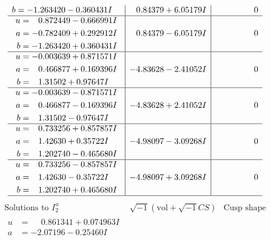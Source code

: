 \documentclass[1p]{elsarticle_modified}
\theoremstyle{definition}
\newcommand{\I}{\sqrt{-1}}
\begin{document}
$$\begin{array}{c|c|c}
\begin{aligned}
b &= -1.263420 - 0.360431 I\end{aligned}
 & \phantom{-}0.84379 + 6.05179 I & \phantom{-0.000000 } 0 \\ \hline\begin{aligned}
u &= \phantom{-}0.872449 - 0.666991 I \\
a &= -0.782409 + 0.292912 I \\
b &= -1.263420 + 0.360431 I\end{aligned}
 & \phantom{-}0.84379 - 6.05179 I & \phantom{-0.000000 } 0 \\ \hline\begin{aligned}
u &= -0.003639 + 0.871571 I \\
a &= \phantom{-}0.466877 + 0.169396 I \\
b &= \phantom{-}1.31502 + 0.97647 I\end{aligned}
 & -4.83628 - 2.41052 I & \phantom{-0.000000 } 0 \\ \hline\begin{aligned}
u &= -0.003639 - 0.871571 I \\
a &= \phantom{-}0.466877 - 0.169396 I \\
b &= \phantom{-}1.31502 - 0.97647 I\end{aligned}
 & -4.83628 + 2.41052 I & \phantom{-0.000000 } 0 \\ \hline\begin{aligned}
u &= \phantom{-}0.733256 + 0.857857 I \\
a &= \phantom{-}1.42630 + 0.35722 I \\
b &= \phantom{-}1.202740 - 0.465680 I\end{aligned}
 & -4.98097 - 3.09268 I & \phantom{-0.000000 } 0 \\ \hline\begin{aligned}
u &= \phantom{-}0.733256 - 0.857857 I \\
a &= \phantom{-}1.42630 - 0.35722 I \\
b &= \phantom{-}1.202740 + 0.465680 I\end{aligned}
 & -4.98097 + 3.09268 I & \phantom{-0.000000 } 0\\
 \hline 
 \end{array}$$\newpage$$\begin{array}{c|c|c}  
\text{Solutions to }I^u_{2}& \I (\text{vol} + \sqrt{-1}CS) & \text{Cusp shape}\\
 \hline 
\begin{aligned}
u &= \phantom{-}0.861341 + 0.074963 I \\
a &= -2.07196 - 0.25460 I \\

\end{aligned}
\end{array}$$
\end{document}
